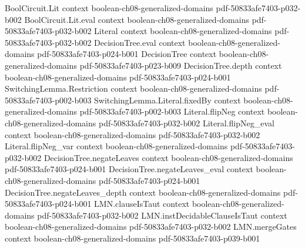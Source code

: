 \begin{lemma}
\label{BooleanAnalysis.innerProduct_chi_self}
\leanok
{}
\proofstep
  {BoolCircuit.Lit}
  {context}
  {boolean-ch08-generalized-domains}
  {pdf-50833afe7403-p032-b002}
\proofstep
  {BoolCircuit.Lit.eval}
  {context}
  {boolean-ch08-generalized-domains}
  {pdf-50833afe7403-p032-b002}
\proofstep
  {Literal}
  {context}
  {boolean-ch08-generalized-domains}
  {pdf-50833afe7403-p032-b002}
\proofstep
  {DecisionTree.eval}
  {context}
  {boolean-ch08-generalized-domains}
  {pdf-50833afe7403-p024-b001}
\proofstep
  {DecisionTree}
  {context}
  {boolean-ch08-generalized-domains}
  {pdf-50833afe7403-p023-b009}
\proofstep
  {DecisionTree.depth}
  {context}
  {boolean-ch08-generalized-domains}
  {pdf-50833afe7403-p024-b001}
\proofstep
  {SwitchingLemma.Restriction}
  {context}
  {boolean-ch08-generalized-domains}
  {pdf-50833afe7403-p002-b003}
\proofstep
  {SwitchingLemma.Literal.fixedBy}
  {context}
  {boolean-ch08-generalized-domains}
  {pdf-50833afe7403-p002-b003}
\proofstep
  {Literal.flipNeg}
  {context}
  {boolean-ch08-generalized-domains}
  {pdf-50833afe7403-p032-b002}
\proofstep
  {Literal.flipNeg_eval}
  {context}
  {boolean-ch08-generalized-domains}
  {pdf-50833afe7403-p032-b002}
\proofstep
  {Literal.flipNeg_var}
  {context}
  {boolean-ch08-generalized-domains}
  {pdf-50833afe7403-p032-b002}
\proofstep
  {DecisionTree.negateLeaves}
  {context}
  {boolean-ch08-generalized-domains}
  {pdf-50833afe7403-p024-b001}
\proofstep
  {DecisionTree.negateLeaves_eval}
  {context}
  {boolean-ch08-generalized-domains}
  {pdf-50833afe7403-p024-b001}
\proofstep
  {DecisionTree.negateLeaves_depth}
  {context}
  {boolean-ch08-generalized-domains}
  {pdf-50833afe7403-p024-b001}
\proofstep
  {LMN.clauseIsTaut}
  {context}
  {boolean-ch08-generalized-domains}
  {pdf-50833afe7403-p032-b002}
\proofstep
  {LMN.instDecidableClauseIsTaut}
  {context}
  {boolean-ch08-generalized-domains}
  {pdf-50833afe7403-p032-b002}
\proofstep
  {LMN.mergeGates}
  {context}
  {boolean-ch08-generalized-domains}
  {pdf-50833afe7403-p039-b001}
\proofstep

\end{lemma}
